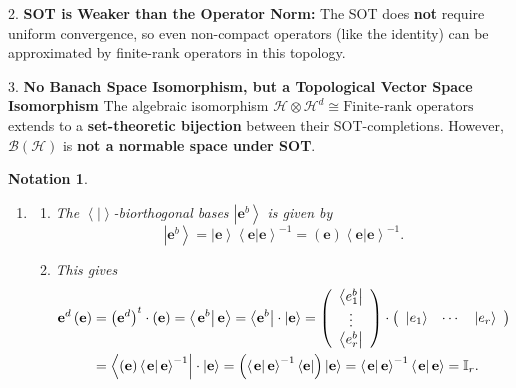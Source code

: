 \documentclass[aps,preprint]{revtex4}
\newtheorem{notation}[theorem]{Notation}
\begin{document}
2. \textbf{SOT is Weaker than the Operator Norm:} The SOT does \textbf{not}
require uniform convergence, so even non-compact operators (like the
identity) can be approximated by finite-rank operators in this topology.

3. \textbf{No Banach Space Isomorphism, but a Topological Vector Space
Isomorphism} The algebraic isomorphism $\mathcal{H}\otimes \mathcal{H}%
^{d}\cong \text{Finite-rank operators}$ extends to a \textbf{set-theoretic
bijection} between their SOT-completions. However, $\mathcal{B}(\mathcal{H})$
is \textbf{not a normable space under SOT}.

\appendix{}

\begin{notation}
\begin{enumerate}
\item 
\begin{enumerate}
\item The $\left\langle \left. {}\right\vert \right\rangle $-biorthogonal
bases $\left\vert \mathbf{e}^{b}\right\rangle $ is given by 
\begin{equation}
\left\vert \mathbf{e}^{b}\right\rangle =\left\vert \mathbf{e}\right\rangle
\left\langle \left. \mathbf{e}\right\vert \mathbf{e}\right\rangle
^{-1}=\left( \mathbf{e}\right) \left\langle \left. \mathbf{e}\right\vert 
\mathbf{e}\right\rangle ^{-1}.
\end{equation}

\item This gives%
\begin{align}
\mathbf{e}^{d}\left( \mathbf{e}\right) & =\left( \mathbf{e}^{d}\right)
^{t}\cdot\left( \mathbf{e}\right) =\left\langle \left. \mathbf{e}%
^{b}\right\vert \mathbf{e}\right\rangle =\left\langle \mathbf{e}%
^{b}\right\vert \cdot\left\vert \mathbf{e}\right\rangle =\left( 
\begin{array}{c}
\left\langle e_{1}^{b}\right\vert \\ 
\vdots \\ 
\left\langle e_{r}^{b}\right\vert%
\end{array}
\right) \cdot\left( 
\begin{array}{ccc}
\left\vert e_{1}\right\rangle & \cdots & \left\vert e_{r}\right\rangle%
\end{array}
\right) \\
& =\left\langle \left( \mathbf{e}\right) \left\langle \left. \mathbf{e}%
\right\vert \mathbf{e}\right\rangle ^{-1}\right\vert \cdot\left\vert \mathbf{%
e}\right\rangle =\left( \left\langle \left. \mathbf{e}\right\vert \mathbf{e}%
\right\rangle ^{-1}\left\langle \mathbf{e}\right\vert \right) \left\vert 
\mathbf{e}\right\rangle =\left\langle \left. \mathbf{e}\right\vert \mathbf{e}%
\right\rangle ^{-1}\left\langle \left. \mathbf{e}\right\vert \mathbf{e}%
\right\rangle =\mathbb{I}_{r}.
\end{align}
\end{enumerate}


\end{enumerate}
\end{notation}
\end{document}
